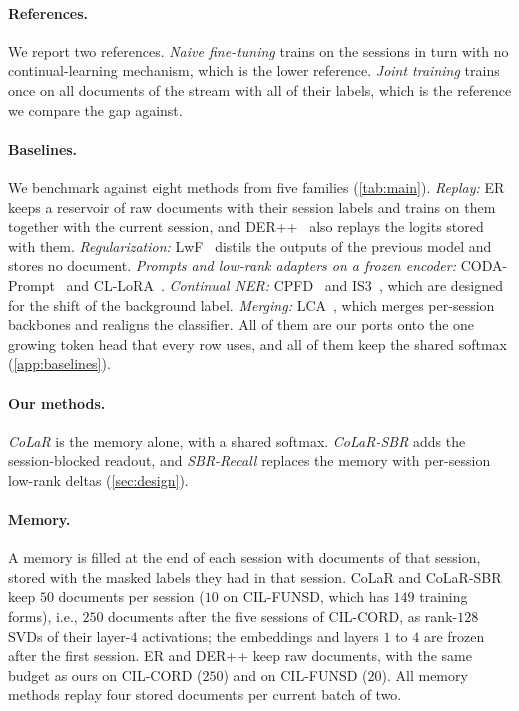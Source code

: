 \documentclass[10pt,twocolumn,letterpaper]{article}
\begin{document}
\paragraph{References.} We report two references. \emph{Naive fine-tuning} trains on the sessions in turn with no continual-learning mechanism, which is the lower reference. \emph{Joint training} trains once on all documents of the stream with all of their labels, which is the reference we compare the gap against.

\paragraph{Baselines.} We benchmark against eight methods from five families (\cref{tab:main}). \emph{Replay:} ER~\citep{rolnick2019er} keeps a reservoir of raw documents with their session labels and trains on them together with the current session, and DER++~\citep{buzzega2020der} also replays the logits stored with them. \emph{Regularization:} LwF~\citep{li2017lwf} distils the outputs of the previous model and stores no document. \emph{Prompts and low-rank adapters on a frozen encoder:} CODA-Prompt~\citep{smith2023coda} and CL-LoRA~\citep{he2025cllora}. \emph{Continual NER:} CPFD~\citep{zhang2023cpfd} and IS3~\citep{qiu2024is3}, which are designed for the shift of the background label. \emph{Merging:} LCA~\citep{lca2026}, which merges per-session backbones and realigns the classifier. All of them are our ports onto the one growing token head that every row uses, and all of them keep the shared softmax (\cref{app:baselines}).

\paragraph{Our methods.} \emph{CoLaR} is the memory alone, with a shared softmax. \emph{CoLaR-SBR} adds the session-blocked readout, and \emph{SBR-Recall} replaces the memory with per-session low-rank deltas (\cref{sec:design}).

\paragraph{Memory.} A memory is filled at the end of each session with documents of that session, stored with the masked labels they had in that session. CoLaR and CoLaR-SBR keep $50$ documents per session ($10$ on CIL-FUNSD, which has $149$ training forms), i.e., $250$ documents after the five sessions of CIL-CORD, as rank-$128$ SVDs of their layer-$4$ activations; the embeddings and layers $1$ to $4$ are frozen after the first session. ER and DER++ keep raw documents, with the same budget as ours on CIL-CORD ($250$) and on CIL-FUNSD ($20$). All memory methods replay four stored documents per current batch of two.
\end{document}

